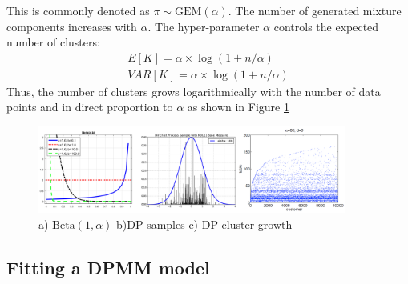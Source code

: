 This is commonly denoted as $\pi \sim \mathrm{GEM}(\alpha)$. The number of generated mixture components increases with $\alpha$. The hyper-parameter $\alpha$ controls the expected number of clusters:
\begin{eqnarray}
    E[K] = \alpha \times \log(1+n/\alpha)\\
    VAR[K] = \alpha \times \log(1+n/\alpha)
\end{eqnarray}
Thus, the number of clusters grows logarithmically with the number of data points and in direct proportion to $\alpha$ as shown in Figure \ref{fig:dpmm_merged1} 
\begin{figure}[thpb]
    \centering
    \includegraphics[width=0.9\textwidth, trim={10 10 10 10}]{figures/dp_merged1.png}
    \caption{a) $\mathrm{Beta}(1,\alpha)$ b)DP samples c) DP cluster growth }
    \label{fig:dpmm_merged1}
\end{figure}

\subsection{Fitting a DPMM model}

